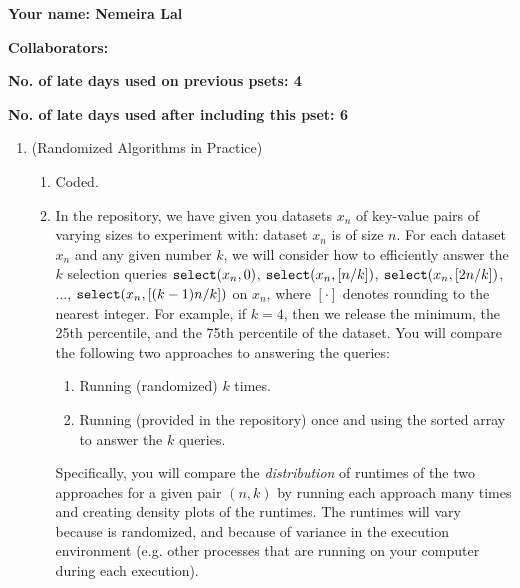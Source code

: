 \documentclass[11pt]{article}
\begin{document}

\textbf{Your name: Nemeira Lal }

\textbf{Collaborators: }

\textbf{No. of late days used on previous psets: 4}

\textbf{No. of late days used after including this pset: 6}

\begin{enumerate}
    \item (Randomized Algorithms in Practice)  
    \begin{enumerate}
        \item Coded.
        
        \item 
        In the repository, we have given you datasets $x_n$ of key-value pairs of varying sizes to experiment with: dataset $x_n$ is of size $n$.  For each dataset $x_n$ and any given number $k$, we will consider how to efficiently answer the $k$ selection queries
        $\texttt{select}(x_n,0)$, $\texttt{select}(x_n,[n/k])$, $\texttt{select}(x_n,[2n/k])$, $\ldots$, $\texttt{select}(x_n,[(k-1)n/k])$ on $x_n$, where $[\cdot]$ denotes rounding to the nearest integer. For example, if $k=4$, then we release the minimum, the 25th percentile, and the 75th percentile of the dataset.  You will compare the following two approaches to answering the queries:
        
        \begin{enumerate}
            \item Running (randomized) \QuickSelect{} $k$ times.
            \item Running \MergeSort{} (provided in the repository) once and using the sorted array to answer the $k$ queries.
        \end{enumerate}
        Specifically, you will compare the {\em distribution} of runtimes of the two approaches for a given pair $(n,k)$ by running each approach many times and creating density plots of the runtimes.  The runtimes will vary because \QuickSelect{}  is randomized, and because of variance in the execution environment (e.g. other processes that are running on your computer during each execution). \vspace{1.5mm}
        

\end{enumerate}
\end{enumerate}
\end{document}

